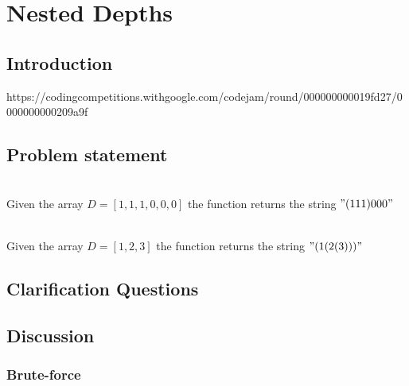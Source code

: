 %

\chapter{Nested Depths}
\label{ch:nesting_depths}
\section*{Introduction}
https://codingcompetitions.withgoogle.com/codejam/round/000000000019fd27/0000000000209a9f

\section{Problem statement}
\begin{exercise}

	\begin{example}
		\hfill \\
		Given the array $D=[1,1,1,0,0,0]$ the function returns the string $"(111)000"$
	\end{example}

	\begin{example}
		\hfill \\
		Given the array $D=[1,2,3]$ the function returns the string $"(1(2(3)))"$
		
	\end{example}
\end{exercise}

\section{Clarification Questions}

\begin{QandA}
	\item 
	\begin{answered}
		\textit{}
	\end{answered}
	
\end{QandA}

\section{Discussion}
\label{nesting_depths:sec:discussion}


\subsection{Brute-force}
\label{nesting_depths:sec:bruteforce}



